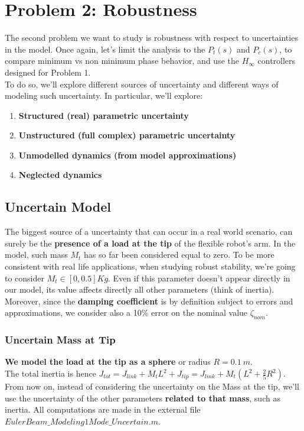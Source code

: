 \documentclass[a4paper, 12pt]{article}
\begin{document}
\clearpage
\section{Problem 2: Robustness}
The second problem we want to study is robustness with respect to uncertainties in the model. Once again, let's limit the analysis to the $P_t(s)$ and $P_c(s)$, to compare minimum vs non minimum phase behavior, and use the $H_\infty$ controllers designed for Problem 1. 
\\ To do so, we'll explore different sources of uncertainty and different ways of modeling such uncertainty. In particular, we'll explore:
\begin{enumerate}
    \item \textbf{Structured (real) parametric uncertainty}
    \item \textbf{Unstructured (full complex) parametric uncertainty}
    \item \textbf{Unmodelled dynamics (from model approximations)}
    \item \textbf{Neglected dynamics}
\end{enumerate}
\subsection{Uncertain Model}
The biggest source of a uncertainty that can occur in a real world scenario, can surely be the \textbf{presence of a load at the tip} of the flexible robot's arm. In the model, such mass $M_t$ has so far been considered equal to zero. To be more consistent with real life applications, when studying robust stability, we're going to consider $M_t \in [0,0.5]Kg$. Even if this parameter doesn't appear directly in our model, its value affects directly all other parameters (think of inertia). Moreover, since the \textbf{damping coefficient} is by definition subject to errors and approximations, we consider also a 10\% error on the nominal value $\zeta_{nom}$.
\subsubsection{Uncertain Mass at Tip}
\textbf{We model the load at the tip as a sphere} or radius $R=0.1\ m$. \\The total inertia is hence $J_{tot} = J_{link}+M_tL^2 + J_{tip} = J_{link}+M_t(L^2+\frac{2}{5}R^2)$.
\\From now on, instead of considering the uncertainty on the Mass at the tip, we'll use the uncertainty of the other parameters \textbf{related to that mass}, such as inertia. All computations are made in the external file $EulerBeam\_Modeling1Mode\_Uncertain.m$.
\end{document}
